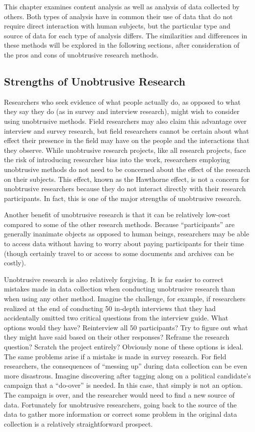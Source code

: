 This chapter examines content analysis as well as analysis of data collected by others. Both types of analysis have in common their use of data that do not require direct interaction with human subjects, but the particular type and source of data for each type of analysis differs. The similarities and differences in these methods will be explored in the following sections, after consideration of the pros and cons of unobtrusive research methods.

\subsection{Strengths of Unobtrusive Research}

Researchers who seek evidence of what people actually do, as opposed to what they say they do (as in survey and interview research), might wish to consider using unobtrusive methods. Field researchers may also claim this advantage over interview and survey research, but field researchers cannot be certain about what effect their presence in the field may have on the people and the interactions that they observe. While unobtrusive research projects, like all research projects, face the risk of introducing researcher bias into the work, researchers employing unobtrusive methods do not need to be concerned about the effect of the research on their subjects. This effect, known as the Hawthorne effect, is not a concern for unobtrusive researchers because they do not interact directly with their research participants. In fact, this is one of the major strengths of unobtrusive research.

Another benefit of unobtrusive research is that it can be relatively low-cost compared to some of the other research methods. Because ``participants'' are generally inanimate objects as opposed to human beings, researchers may be able to access data without having to worry about paying participants for their time (though certainly travel to or access to some documents and archives can be costly).

Unobtrusive research is also relatively forgiving. It is far easier to correct mistakes made in data collection when conducting unobtrusive research than when using any other method. Imagine the challenge, for example, if researchers realized at the end of conducting 50 in-depth interviews that they had accidentally omitted two critical questions from the interview guide. What options would they have? Reinterview all 50 participants? Try to figure out what they might have said based on their other responses? Reframe the research question? Scratch the project entirely? Obviously none of these options is ideal. The same problems arise if a mistake is made in survey research. For field researchers, the consequences of ``messing up'' during data collection can be even more disastrous. Imagine discovering after tagging along on a political candidate's campaign that a ``do-over'' is needed. In this case, that simply is not an option. The campaign is over, and the researcher would need to find a new source of data. Fortunately for unobtrusive researchers, going back to the source of the data to gather more information or correct some problem in the original data collection is a relatively straightforward prospect.

